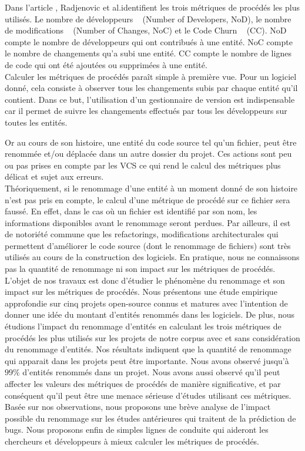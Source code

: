 Dans l'article \cite{radjenovic_software_2013}, Radjenovic et al.identifient les trois métriques de procédés les plus utilisés. Le nombre de développeurs ~\cite{weyuker_too_2008} (Number of Developers, NoD), le nombre de modifications ~\cite{graves_predicting_2000} (Number of Changes, NoC) et le Code Churn ~\cite{munson_code_1998} (CC). NoD compte le nombre de développeurs qui ont contribués à une entité. NoC compte le nombre de changements qu'a subi une entité. CC compte le nombre de lignes de code qui ont été ajoutées ou supprimées à une entité.\\

Calculer les métriques de procédés paraît simple à première vue. Pour un logiciel donné, cela consiste à observer tous les changements subis par chaque entité qu'il contient. Dans ce but, l'utilisation d'un gestionnaire de version est indispensable car il permet de suivre les changements effectués par tous les développeurs sur toutes les entités. 

Or au cours de son histoire, une entité du code source tel qu'un fichier, peut être renommée et/ou déplacée dans un autre dossier du projet. Ces actions sont peu ou pas prises en compte par les VCS ce qui rend le calcul des métriques plus délicat et sujet aux erreurs.\\

Théoriquement, si le renommage d'une entité à un moment donné de son histoire n'est pas pris en compte, le calcul d'une métrique de procédé sur ce fichier sera faussé. En effet, dans le cas où un fichier est identifié par son nom, les informations disponibles avant le renommage seront perdues. Par ailleurs, il est de notoriété commune que les refactorings, modifications architecturales qui permettent d'améliorer le code source (dont le renommage de fichiers) sont très utilisés au cours de la construction des logiciels. En pratique, nous ne connaissons pas la quantité de renommage ni son impact sur les métriques de procédés.\\

L’objet de nos travaux est donc d’étudier le phénomène du renommage et son impact sur les métriques de procédés. Nous présentons une étude empirique approfondie sur cinq projets open-source connus et matures avec l'intention de donner une idée du montant d'entités renommés dans les logiciels. De plus, nous étudions l'impact du renommage d'entités en calculant les trois métriques de procédés les plus utilisés sur les projets de notre corpus avec et sans considération du renommage d'entités. Nos résultats indiquent que la quantité de renommage qui apparait dans les projets peut être importante. Nous avons observé jusqu'à $99\%$ d'entités renommés dans un projet. Nous avons aussi observé qu'il peut affecter les valeurs des métriques de procédés de manière significative, et par conséquent qu'il peut être une menace sérieuse d'études utilisant ces métriques. Basée sur nos observations, nous proposons une brève analyse de l'impact possible du renommage sur les études antérieures qui traitent de la prédiction de bugs. Nous proposons enfin de simples lignes de conduite qui aideront les chercheurs et développeurs à mieux calculer les métriques de procédés.\\


